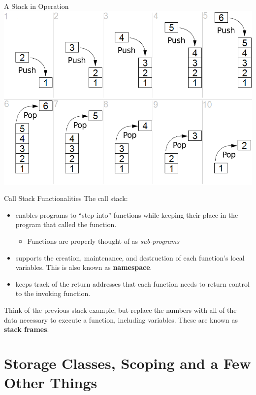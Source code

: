\documentclass[11pt]{beamer}
\begin{document}
\begin{frame}{A Stack in Operation}
\center
\includegraphics[scale=0.4]{Lifo_stack.png}
\end{frame}

\begin{frame}{Call Stack Functionalities}
The call stack: 
\begin{itemize}
\item enables programs to ``step into'' functions while keeping their place in the program that called the function.
\begin{itemize}
	\item Functions are properly thought of as \emph{sub-programs}
\end{itemize}
\item supports the creation, maintenance, and destruction of each function's local variables.  This is also known as \textbf{namespace}.  
\item keeps track of the return addresses that each function needs to return control to the invoking function.  
\end{itemize}
Think of the previous stack example, but replace the numbers with all of the data necessary to execute a function, including variables.  These are known as \textbf{stack frames}.
\end{frame}

\section[Vars]{Storage Classes, Scoping and a Few Other Things}
\end{document}
